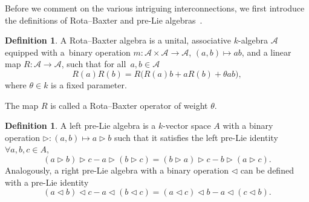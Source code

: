 \documentclass[pdftex]{sigma}
\numberwithin{equation}{section}
\theoremstyle{definition}
\newtheorem{defn}[thm]{Definition}
\begin{document}
Before we comment on the various intriguing interconnections, we first introduce the definitions of Rota--Baxter and pre-Lie algebras~\cite{Rota, RBLoday, Fer, Rota2, Rota3}.
\begin{defn}%
A Rota--Baxter algebra is a unital, associative $k$-algebra $\mathcal{A}$ equipped {with a~binary operation $m\colon \mathcal{A} \times \mathcal{A} \to \mathcal{A}$, $(a,b) \mapsto a b$,} and a linear map $R\colon \mathcal{A} \to \mathcal{A}$, such that for all~${a,b \in \mathcal{A}}$
\begin{equation}
R(a) R(b) = R\bigl(R(a) b + aR(b) + \theta ab\bigr), \label{RB}
\end{equation}
where $\theta \in k$ is a fixed parameter.
\end{defn}

The map $R$ is called a Rota--Baxter operator of weight $\theta$.

\begin{defn}%
A left pre-Lie algebra is a $k$-vector space $A$ with a binary operation
$
\triangleright\colon (a,b) \mapsto a \triangleright b$ such that it satisfies the left pre-Lie identity $\forall a,b,c \in A$,
\begin{equation}
(a \triangleright b) \triangleright c- a \triangleright(b \triangleright c) = (b \triangleright a) \triangleright c- b \triangleright(a \triangleright c). \label{prelie}
\end{equation}
 Analogously, a right pre-Lie algebra with a binary operation $\triangleleft$ can be defined with a pre-Lie identity
\begin{equation*}
(a \triangleleft b) \triangleleft c- a \triangleleft (b \triangleleft c) = (a \triangleleft c) \triangleleft b- a \triangleleft(c \triangleleft b). %
\end{equation*}
\end{defn}
\end{document}
